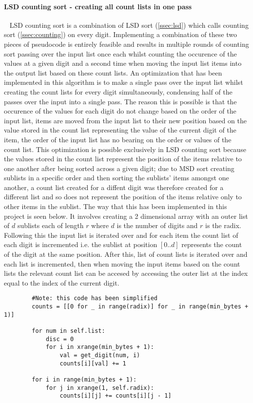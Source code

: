 \documentclass[12pt]{article}
\begin{document}
\paragraph{LSD counting sort - creating all count lists in one pass}\
\newline
LSD counting sort is a combination of LSD sort (\ref{ssec:lsd}) which calls counting sort (\ref{ssec:counting}) on every digit. Implementing a combination of these two pieces of pseudocode is entirely feasible and results in multiple rounds of counting sort passing over the input list once each whilst counting the occurence of the values at a given digit and a second time when moving the input list items into the output list based on these count lists.
\newline
An optimization that has been implemented in this algorithm is to make a single pass over the input list whilst creating the count lists for every digit simultaneously, condensing half of the passes over the input into a single pass. The reason this is possible is that the occurence of the values for each digit do not change based on the order of the input list, items are moved from the input list to their new position based on the value stored in the count list representing the value of the current digit of the item, the order of the input list has no bearing on the order or values of the count list. 
\newline
This optimization is possible exclusively in LSD counting sort because the values stored in the count list represent the position of the items relative to one another after being sorted across a given digit; due to MSD sort creating sublists in a specific order and then sorting the sublists' items amongst one another, a count list created for a diffent digit was therefore created for a different list and so does not represent the position of the items relative only to other items in the sublist.
\newline
The way that this has been implemented in this project is seen below. It involves creating a 2 dimensional array with an outer list of $d$ sublists each of length $r$ where $d$ is the number of digits and $r$ is the radix. Following this the input list is iterated over and for each item the count list of each digit is incremented i.e. the sublist at position $[0..d]$ represents the count of the digit at the same position. After this, list of count lists is iterated over and each list is incremented, then when moving the input items based on the count lists the relevant count list can be accesed by accessing the outer list at the index equal to the index of the current digit.\newline
	\begin{lstlisting}
		#Note: this code has been simplified
		counts = [[0 for _ in range(radix)] for _ in range(min_bytes + 1)]

		for num in self.list:
			disc = 0
			for i in xrange(min_bytes + 1):
				val = get_digit(num, i)
				counts[i][val] += 1

		for i in range(min_bytes + 1):
			for j in xrange(1, self.radix):
				counts[i][j] += counts[i][j - 1]
	\end{lstlisting}
\end{document}
